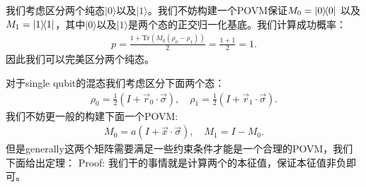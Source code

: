 我们考虑区分两个纯态$ |0\rangle $以及$ |1\rangle $。我们不妨构建一个POVM保证$ M_0
= \left| 0 \middle\rangle\!\middle\langle 0 \right| $ 以及$ M_1 = \left| 1 \middle\rangle\!\middle\langle 1 \right| $，其中$ |0\rangle $以及$
|1\rangle $是两个态的正交归一化基底。我们计算成功概率：
\begin{align}
  p=\frac{1+\mathrm{Tr}(M_0(\rho_0-\rho_1))}{2}=\frac{1+1}{2}=1.
\end{align}
因此我们可以完美区分两个纯态。

\bigskip
{}

对于single qubit的混态我们考虑区分下面两个态：
\begin{align}
  \rho_0 = \frac{1}{2}\left( I + \vec{r}_0 \cdot \vec{\sigma} \right), \quad
  \rho_1 = \frac{1}{2}\left( I + \vec{r}_1 \cdot \vec{\sigma} \right).
\end{align}
我们不妨更一般的构建下面一个POVM:
\begin{align}
  M_0 = a\!\left(I + \vec{x}\!\cdot\!\vec{\sigma}\right),
  \quad
  M_1 = I - M_0 .
\end{align}
但是generally这两个矩阵需要满足一些约束条件才能是一个合理的POVM，我们下面给出定理：
Proof: 我们干的事情就是计算两个的本征值，保证本征值非负即可。

